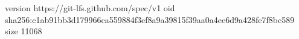 version https://git-lfs.github.com/spec/v1
oid sha256:c1ab91bb3d179966ca559884f3ef8a9a39815f39aa0a4ee6d9a428fe7f8bc589
size 11068
